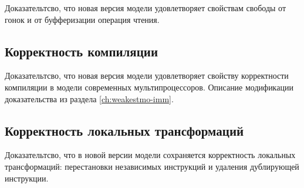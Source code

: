 Доказательтсво, что новая версия модели
удовлетворяет свойствам свободы от гонок и от буфферизации операция чтения.

\subsection{Корректность компиляции}

Доказательтсво, что новая версия модели
удовлетворяет свойству корректности компиляции в модели
современных мультипроцессоров.
Описание модификации доказательства из раздела \ref{ch:weakestmo-imm}.

\subsection{Корректность локальных трансформаций}

Доказательтсво, что в новой версии модели
сохраняется корректность локальных трансформаций:
перестановки независимых инструкций и удаления дублирующей инструкции. 

